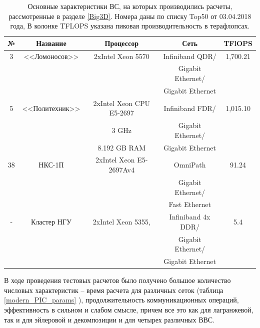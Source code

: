 \begin{table}[ht]
	\caption{
		Основные характеристики ВС, на которых производились расчеты, рассмотренные в разделе \ref{Big3D}. Номера даны по списку Top50 от 03.04.2018 года, В колонке TFLOPS указана пиковая производительность в терафлопсах.}
	\begin{center}
		\begin{tabular}{|c|c|c|c|c|}
			\hline
			
			№ & Название       & Процессор                & Сеть                &  TFlOPS\\
			\hline 
			3 & <<Ломоносов>>  &  2xIntel Xeon 5570       &  Infiniband QDR/   &   1,700.21 \\
			&                &                          &  Gigabit Ethernet/ &            \\
			&                &                          &  Gigabit Ethernet  &            \\ \hline
			
			5 & <<Политехник>> & 2xIntel Xeon CPU E5-2697 &  Infiniband FDR/   &   1,015.10 \\
			&                & 3 GHz                    &  Gigabit Ethernet/ &            \\
			&                & 8.192 GB RAM             &  Gigabit Ethernet  &            \\ \hline
			
			38& НКС-1П         & 2xIntel Xeon E5-2697Av4  & OmniPath           & 91.24      \\
			&                 &                          & Gigabit Ethernet/  &            \\
			&                 &                          & Fast Ethernet      &            \\ \hline
			
			- & Кластер НГУ    & 2xIntel Xeon 5355,       &  Infiniband 4x DDR/& 5.4 \\ 
			&			       &                          &   Gigabit Ethernet/&  \\
			&			       &                          &   Gigabit Ethernet &  \\ \hline                    
			
		\end{tabular}
	\end{center}
	\label{top50_2018}
\end{table}


В ходе проведения тестовых расчетов было получено большое количество числовых характеристик – время расчета для различных сеток (таблица \ref{modern_PIC_params} ), продолжительность коммуникационных операций, эффективность в сильном и слабом смысле, причем все это как для лагранжевой, так и для эйлеровой и декомпозиции и для четырех различных ВВС. 

